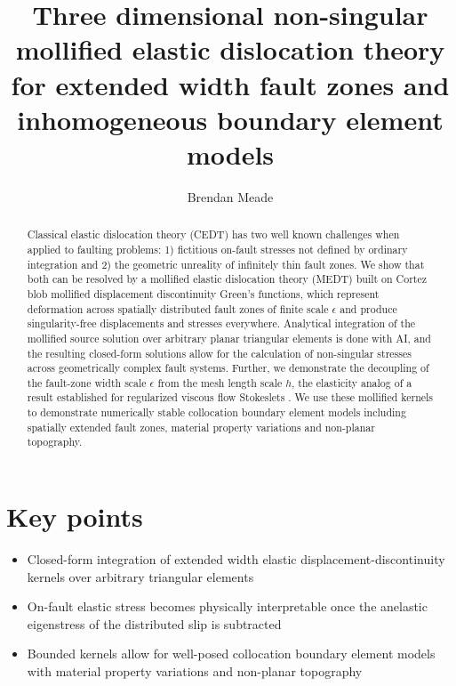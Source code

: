 \documentclass[12pt]{article}
\title{Three dimensional non-singular mollified elastic dislocation theory for extended width fault zones and inhomogeneous boundary element models}
\author[1]{Brendan Meade}
\affil[1]{Department of Earth \& Planetary Sciences, Harvard University, Cambridge, Massachusetts, meade@fas.harvard.edu}
\date{}
\newcommand{\eps}{\epsilon}
\begin{document}
\maketitle


\clearpage
\section*{Key points}

\begin{itemize}
    \item Closed-form integration of extended width elastic displacement-discontinuity kernels over arbitrary triangular elements
    \item On-fault elastic stress becomes physically interpretable once the anelastic eigenstress of the distributed slip is
      subtracted
    \item Bounded kernels allow for well-posed collocation boundary element models with material property variations and non-planar topography
 \end{itemize}


\clearpage
\begin{abstract}
Classical elastic dislocation theory (CEDT) has two well known challenges when applied to faulting problems: 1) fictitious on-fault stresses not defined by ordinary integration and 2) the geometric unreality of infinitely thin fault zones.  We show that both can be resolved by a mollified elastic dislocation theory (MEDT) built on Cortez blob \citep{Cortez2001} mollified displacement discontinuity Green's functions, which represent deformation across spatially distributed fault zones of finite scale $\eps$ and produce singularity-free displacements and stresses everywhere.  Analytical integration of the mollified source solution over arbitrary planar triangular elements is done with AI, and the resulting closed-form solutions allow for the calculation of non-singular stresses across geometrically complex fault systems.  Further, we demonstrate the decoupling of the fault-zone width scale $\eps$ from the mesh length scale $h$, the elasticity analog of a result established for regularized viscous flow Stokeslets \citep{FerrantiCortez2024}.  We use these mollified kernels to demonstrate numerically stable collocation boundary element models including spatially extended fault zones, material property variations and non-planar topography.
\end{abstract}


\clearpage
\end{document}
